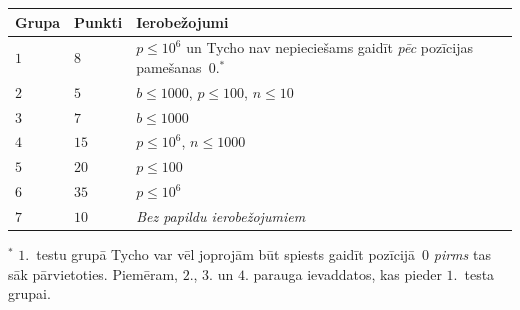 \medskip
\begin{tabular}{lll}
  Grupa & Punkti & Ierobežojumi\\\hline
  $1$ & $8$  & $p\leq 10^6$ un Tycho nav nepieciešams gaidīt \emph{pēc} pozīcijas pamešanas~$0$.$^*$ \\ %
  $2$ & $5$  & $b\leq 1000$, $p\leq 100$, $n\leq 10$ \\
  $3$ & $7$  & $b\leq 1000$ \\
  $4$ & $15$ & $p\leq 10^6$, $n\leq 1000$\\
  $5$ & $20$ & $p\leq 100$\\
  $6$ & $35$ & $p\leq 10^6$\\
  $7$ & $10$ & \emph{Bez papildu ierobežojumiem}
\end{tabular}

\medskip
\noindent $^*$ $1$.~testu grupā Tycho var vēl joprojām būt spiests gaidīt pozīcijā~$0$ \emph{pirms} tas sāk pārvietoties. Piemēram, $2$., $3$. un $4$. parauga ievaddatos, kas pieder $1$.~testa grupai.
